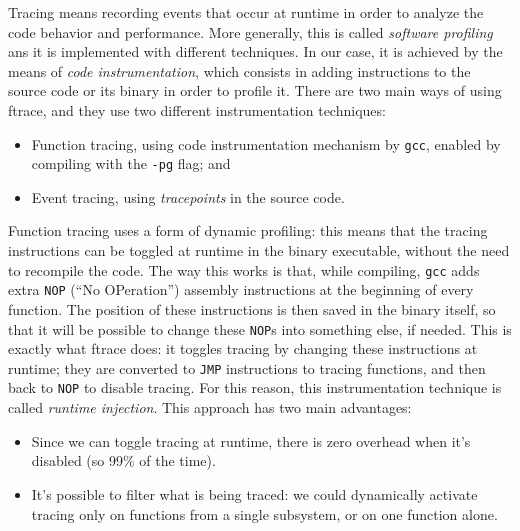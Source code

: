Tracing means recording events that occur at runtime in order to analyze the code behavior and performance. More generally, this is called \textit{software profiling} ans it is implemented with different techniques. In our case, it is achieved by the means of \textit{code instrumentation}, which consists in adding instructions to the source code or its binary in order to profile it. There are two main ways of using ftrace, and they use two different instrumentation techniques:
\begin{itemize}
    \item Function tracing, using code instrumentation mechanism by \verb|gcc|, enabled by compiling with the \verb|-pg| flag; and
    \item Event tracing, using \textit{tracepoints} in the source code.
\end{itemize}
Function tracing uses a form of dynamic profiling: this means that the tracing instructions can be toggled at runtime in the binary executable, without the need to recompile the code. The way this works is that, while compiling, \verb|gcc| adds extra \verb|NOP| (``No OPeration'') assembly instructions at the beginning of every function. The position of these instructions is then saved in the binary itself, so that it will be possible to change these \verb|NOP|s into something else, if needed. This is exactly what ftrace does: it toggles tracing by changing these instructions at runtime; they are converted to \verb|JMP| instructions to tracing functions, and then back to \verb|NOP| to disable tracing. For this reason, this instrumentation technique is called \textit{runtime injection}. This approach has two main advantages: 
\begin{itemize}
    \item Since we can toggle tracing at runtime, there is zero overhead when it's disabled (so 99\% of the time).
    \item It's possible to filter what is being traced: we could dynamically activate tracing only on functions from a single subsystem, or on one function alone.
\end{itemize}

